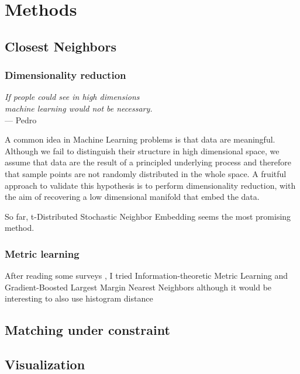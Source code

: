 \chapter{Methods}
\label{chap:methods}

\section{Closest Neighbors}

\subsection{Dimensionality reduction}

\begin{flushright}{\slshape
 If people could see in high dimensions \\
 machine learning would not be necessary.
} \\ \medskip
--- Pedro \Textcite{MLKnowledge12}
\end{flushright}

A common idea in Machine Learning problems is that data are meaningful.
Although we fail to distinguish their structure in high dimensional space, we
assume that data are the result of a principled underlying process and
therefore that sample points are not randomly distributed in the whole space.
A fruitful approach to validate this hypothesis is to perform dimensionality
reduction, with the aim of recovering a low dimensional manifold that embed
the data.

So far, t-Distributed Stochastic Neighbor Embedding \autocite{tSNE08} seems
the most promising method.

\subsection{Metric learning}

After reading some surveys \autocite{MetricSurvey06, MetricSurvey13}, I tried
Information-theoretic Metric Learning \autocite{InfoMetric07} and
Gradient-Boosted Largest Margin Nearest Neighbors \autocite{GBLMNN12} although
it would be interesting to also use histogram distance
\autocite{HistogramDistance02}

\section{Matching under constraint}

\section{Visualization}
